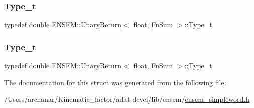 \mbox{\label{structENSEM_1_1UnaryReturn_3_01float_00_01FnSum_01_4_a0cb79ec09e03be62cf6790bcbd3d89c3}} 
\subsubsection{\texorpdfstring{Type\_t}{Type\_t}\hspace{0.1cm}{\footnotesize\ttfamily [2/3]}}
{\footnotesize\ttfamily typedef double \mbox{\hyperlink{structENSEM_1_1UnaryReturn}{E\+N\+S\+E\+M\+::\+Unary\+Return}}$<$ float, \mbox{\hyperlink{structENSEM_1_1FnSum}{Fn\+Sum}} $>$\+::\mbox{\hyperlink{structENSEM_1_1UnaryReturn_3_01float_00_01FnSum_01_4_a0cb79ec09e03be62cf6790bcbd3d89c3}{Type\+\_\+t}}}

\mbox{\label{structENSEM_1_1UnaryReturn_3_01float_00_01FnSum_01_4_a0cb79ec09e03be62cf6790bcbd3d89c3}} 
\subsubsection{\texorpdfstring{Type\_t}{Type\_t}\hspace{0.1cm}{\footnotesize\ttfamily [3/3]}}
{\footnotesize\ttfamily typedef double \mbox{\hyperlink{structENSEM_1_1UnaryReturn}{E\+N\+S\+E\+M\+::\+Unary\+Return}}$<$ float, \mbox{\hyperlink{structENSEM_1_1FnSum}{Fn\+Sum}} $>$\+::\mbox{\hyperlink{structENSEM_1_1UnaryReturn_3_01float_00_01FnSum_01_4_a0cb79ec09e03be62cf6790bcbd3d89c3}{Type\+\_\+t}}}



The documentation for this struct was generated from the following file\+:\begin{DoxyCompactItemize}
\item 
/\+Users/archanar/\+Kinematic\+\_\+factor/adat-\/devel/lib/ensem/\mbox{\hyperlink{adat-devel_2lib_2ensem_2ensem__simpleword_8h}{ensem\+\_\+simpleword.\+h}}\end{DoxyCompactItemize}
